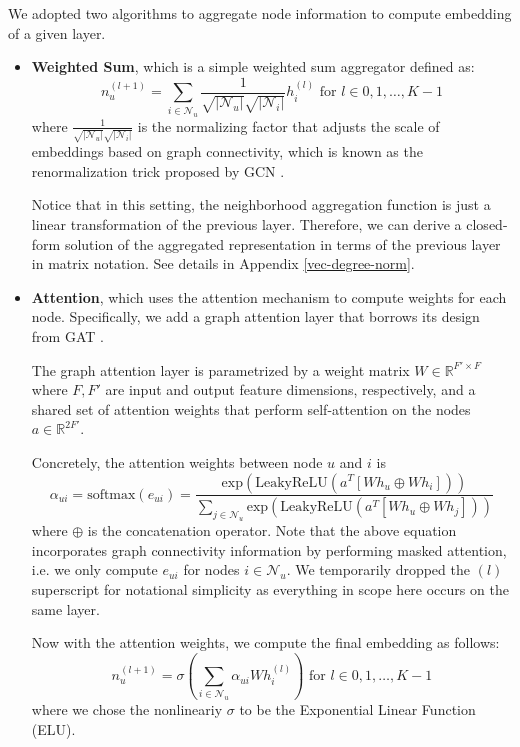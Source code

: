 \documentclass{article}
\begin{document}
We adopted two algorithms to aggregate node information to compute embedding of a given layer. 
\begin{itemize}
    \item \textbf{Weighted Sum}, which is a simple weighted sum aggregator defined as: $$n_u^{(l+1)}=\sum_{i\in \mathcal{N}_u} \frac{1}{\sqrt{|\mathcal{N}_u|} \sqrt{|\mathcal{N}_i|}} h_i^{(l)} \text{ for } l \in 0, 1, \hdots, K - 1$$
    where $\frac{1}{\sqrt{|\mathcal{N}_u|} \sqrt{|\mathcal{N}_i|}}$ is the normalizing factor that adjusts the scale of embeddings based on graph connectivity, which is known as the renormalization trick proposed by GCN \cite{gcn}.

    Notice that in this setting, the neighborhood aggregation function is just a linear transformation of the previous layer. Therefore, we can derive a closed-form solution of the aggregated representation in terms of the previous layer in matrix notation. See details in Appendix \ref{vec-degree-norm}.
    
    \item \textbf{Attention}, which uses the attention mechanism to compute weights for each node. Specifically, we add a graph attention layer that borrows its design from GAT \cite{gat}. 
    
    The graph attention layer is parametrized by a weight matrix $W \in \mathbb{R}^{F' \times F}$ where $F, F'$ are input and output feature dimensions, respectively, and a shared set of attention weights that perform self-attention on the nodes $a \in \mathbb{R}^{2F'}$. 

    Concretely, the attention weights between node $u$ and $i$ is $$\alpha_{ui} = \text{softmax} (e_{ui}) = \frac{\text{exp}(\text{LeakyReLU} (a^T [Wh_u \oplus Wh_i]) )}{\sum_{j\in \mathcal{N}_u}  \text{exp}(\text{LeakyReLU} (a^T [Wh_u \oplus Wh_j]) )}$$
    where $\oplus$ is the concatenation operator. Note that the above equation incorporates graph connectivity information by performing masked attention, i.e. we only compute $e_{ui}$ for nodes $i\in \mathcal{N}_u$. We temporarily dropped the ${(l)}$ superscript for notational simplicity as everything in scope here occurs on the same layer.

    Now with the attention weights, we compute the final embedding as follows: $$n_u^{(l + 1)} = \sigma ( \sum_{i\in \mathcal{N}_u} \alpha_{ui} W h_i^{(l)}  ) \text{ for } l \in 0, 1, \hdots, K - 1 $$ where we chose the nonlineariy $\sigma$ to be the Exponential Linear Function (ELU).
\end{itemize}
\end{document}
